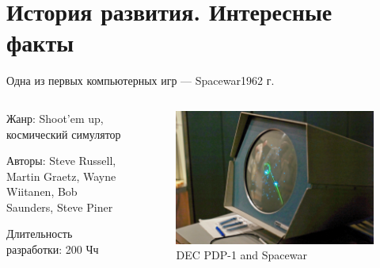 \documentclass{beamer}
\begin{document}
	\section{История развития. Интересные факты}
	
	\begin{frame}{Одна из первых компьютерных игр --- Spacewar}{1962 г.}
	
	\begin{columns}
		
		\begin{column}{0.5\textwidth}
			
			
			Жанр: Shoot’em up, космический симулятор
			
			Авторы: Steve Russell, Martin Graetz, Wayne Wiitanen, Bob Saunders, Steve Piner
			
			
			Длительность разработки: 200 Чч
			
		\end{column}
		\begin{column}{0.5\textwidth}
			\begin{figure} 
			\includegraphics[width=\textwidth]{images/Spacewar.png}
			\caption {DEC PDP-1 and Spacewar}
			\end{figure}
		\end{column}
		
	\end{columns}
	
	
	\end{frame}
\end{document}
